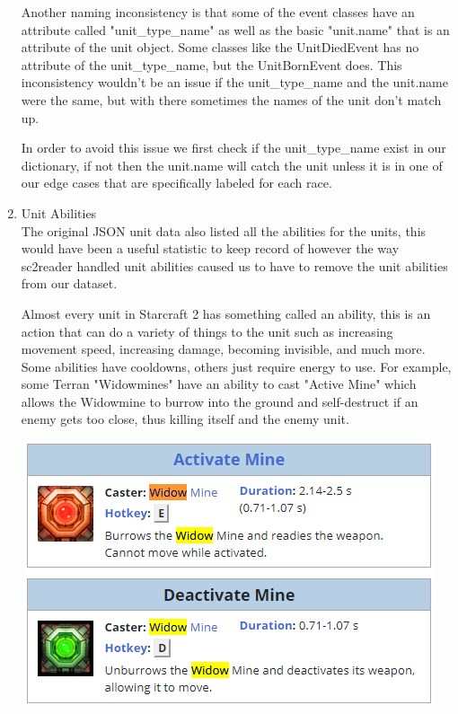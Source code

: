 \documentclass[a4paper,12pt]{report}
\begin{document}
\begin{enumerate}
Another naming inconsistency is that some of the event classes have an attribute called "unit\_type\_name" as well as the basic "unit.name" that is an attribute of the unit object. Some classes like the UnitDiedEvent has no attribute of the unit\_type\_name, but the UnitBornEvent does. This inconsistency wouldn’t be an issue if the unit\_type\_name and the unit.name were the same, but with there sometimes the names of the unit don't match up.

In order to avoid this issue we first check if the unit\_type\_name exist in our dictionary, if not then the unit.name will catch the unit unless it is in one of our edge cases that are specifically labeled for each race.

\item Unit Abilities \\
The original JSON unit data also listed all the abilities for the units, this would have been a useful statistic to keep record of however the way sc2reader handled unit abilities caused us to have to remove the unit abilities from our dataset. 

Almost every unit in Starcraft 2 has something called an ability, this is an action that can do a variety of things to the unit such as increasing movement speed, increasing damage, becoming invisible, and much more. Some abilities have cooldowns, others just require energy to use. For example, some Terran "Widowmines" have an ability to cast "Active Mine" which allows the Widowmine to burrow into the ground and self-destruct if an enemy gets too close, thus killing itself and  the enemy unit.

\begin{center}
    \captionsetup{type=figure}
    \includegraphics[width=.9\linewidth]{media/Mines.png}
\end{center}


\end{enumerate}
\end{document}

